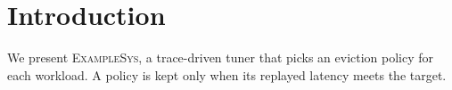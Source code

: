 \section{Introduction}
We present \textsc{ExampleSys}, a trace-driven tuner that picks
an eviction policy for each workload.
A policy is kept only when its replayed latency meets the target.

